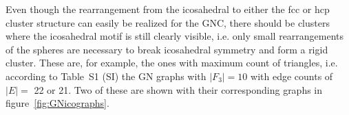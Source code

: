 Even though the rearrangement from the icosahedral to either the fcc or hcp
cluster structure can easily be realized for the GNC, there should be clusters
where the icosahedral motif is still clearly visible, i.e. only small
rearrangements of the spheres are necessary to break icosahedral symmetry and form
a rigid cluster. These are, for example, the ones with maximum count of
triangles, i.e. according to Table~S1 (SI) the GN graphs with $|F_3|=10$ with
edge counts of $|E|=$ 22 or 21. Two of these are shown with their corresponding
graphs in figure~\ref{fig:GNicographs}.
\begin{figure}[htb]
    \centering
    \\

\end{figure}

